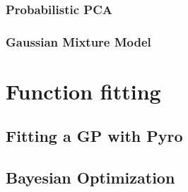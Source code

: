 \subsubsection{Probabilistic PCA}

\subsubsection{Gaussian Mixture Model}


\section{Function fitting}
\subsection{Fitting a GP with Pyro}

\subsection{Bayesian Optimization}





\begin{appendices}

\end{appendices}
